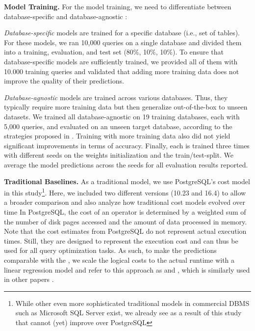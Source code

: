 \noindent\textbf{Model Training.}
For the model training, we need to differentiate between database-specific and database-agnostic \lcms:

\textit{Database-specific} models are trained for a specific database (i.e., set of tables).
For these models, we ran 10,000 queries on a single database and divided them into a training, evaluation, and test set (80\%, 10\%, 10\%).
To ensure that database-specific models are sufficiently trained, we provided all of them with 10.000 training queries and validated that adding more training data does not improve the quality of their predictions.

\textit{Database-agnostic} models are trained across various databases. 
Thus, they typically require more training data but then generalize out-of-the-box to unseen datasets.
We trained all database-agnostic \lcms on 19 training databases, each with 5,000 queries, and evaluated on an unseen target database, according to the strategies proposed in \cite{hilprecht2022, zibo_liang_dace_2024}.
Training with more training data also did not yield significant improvements in terms of accuracy.
Finally, each \lcm is trained three times with different seeds on the weights initialization and the train/test-split.
We average the model predictions across the seeds for all evaluation results reported.

\textbf{Traditional Baselines.}
As a traditional model, we use PostgreSQL's cost model in this study\footnote{While other even more sophisticated traditional models in commercial DBMS such as Microsoft SQL Server exist, we already see as a result of this study that \lcms cannot (yet) improve over PostgreSQL}.
Here, we included two different versions (10.23 and 16.4) to allow a broader comparison and also analyze how traditional cost models evolved over time
In PostgreSQL, the cost of an operator is determined by a weighted sum of the number of disk pages accessed and the amount of data processed in memory.
Note that the cost estimates from PostgreSQL do not represent actual execution times.
Still, they are designed to represent the execution cost and can thus be used for all query optimization tasks.
As such, to make the predictions comparable with the \lcms, we scale the logical costs to the actual runtime with a linear regression model and refer to this approach as \postgresx and \postgresxvi, which is similarly used in other papers \cite{yang2023, zibo_liang_dace_2024, hilprecht2022, zhao2022}.

